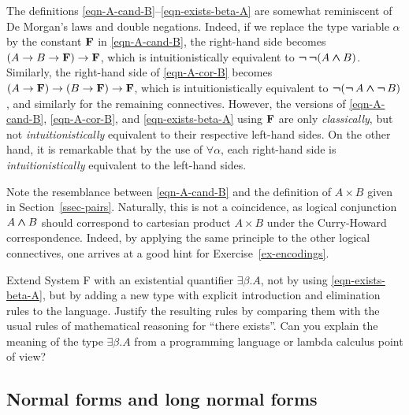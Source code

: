 \documentclass{article}
\begin{document}
\begin{remark}
  The definitions {\eqref{eqn-A-cand-B}}--{\eqref{eqn-exists-beta-A}}
  are somewhat reminiscent of De Morgan's laws and double negations.
  Indeed, if we replace the type variable $\alpha$ by the constant
  ${\bf F}$ in {\eqref{eqn-A-cand-B}}, the right-hand side becomes
  $(A\to B\to{\bf F})\to{\bf F}$, which is intuitionistically
  equivalent to $\mathop{\textrm{\rm\boldmath $\neg$}}\mathop{\textrm{\rm\boldmath $\neg$}}(A\mathbin{\textrm{\rm\boldmath $\wedge$}} B)$. Similarly, the right-hand side
  of {\eqref{eqn-A-cor-B}} becomes
  $(A\to{\bf F})\to(B\to{\bf F})\to{\bf F}$, which is
  intuitionistically equivalent to $\mathop{\textrm{\rm\boldmath $\neg$}}(\mathop{\textrm{\rm\boldmath $\neg$}} A\mathbin{\textrm{\rm\boldmath $\wedge$}}\mathop{\textrm{\rm\boldmath $\neg$}} B)$, and
  similarly for the remaining connectives. However, the versions of
  {\eqref{eqn-A-cand-B}}, {\eqref{eqn-A-cor-B}}, and
  {\eqref{eqn-exists-beta-A}} using ${\bf F}$ are only {\em
    classically}, but not {\em intuitionistically} equivalent to
  their respective left-hand sides. On the other hand, it is
  remarkable that by the use of $\forall\alpha$, each right-hand
  side is {\em intuitionistically} equivalent to the left-hand sides.
\end{remark}

\begin{remark}
  Note the resemblance between {\eqref{eqn-A-cand-B}} and the
  definition of $A\times B$ given in Section~\ref{ssec-pairs}.
  Naturally, this is not a coincidence, as logical conjunction $A\mathbin{\textrm{\rm\boldmath $\wedge$}}
  B$ should correspond to cartesian product $A\times B$ under the
  Curry-Howard correspondence. Indeed, by applying the same principle
  to the other logical connectives, one arrives at a good hint for
  Exercise~\ref{ex-encodings}.
\end{remark}

\begin{exercise}
  Extend System F with an existential quantifier $\exists\beta.A$, not
  by using {\eqref{eqn-exists-beta-A}}, but by adding a new type with
  explicit introduction and elimination rules to the language. Justify
  the resulting rules by comparing them with the usual rules of
  mathematical reasoning for ``there exists''. Can you explain the
  meaning of the type $\exists\beta.A$ from a programming language or
  lambda calculus point of view?
\end{exercise}

\subsection{Normal forms and long normal forms}
\end{document}
